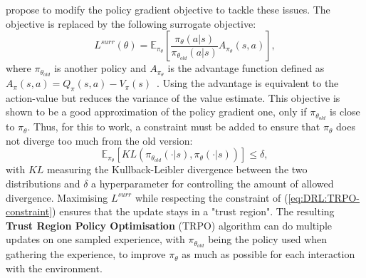 \citet{Schulman2015_TRPO} propose to modify the policy gradient objective to tackle these issues. The objective is replaced by the following surrogate objective:
\begin{equation}
    L^{surr}(\theta)=\mathbb{E}_{\pi_\theta}\left[\frac{\pi_\theta(a|s)}{\pi_{\theta_{old}}(a|s)}A_{\pi_\theta}(s,a)\right],
    \label{eq:DRL:TRPO-surr}
\end{equation}
where $\pi_{\theta_{old}}$ is another policy and $A_{\pi_\theta}$ is the advantage function defined as $A_\pi(s,a)=Q_\pi(s,a)-V_\pi(s)$~\citep{Baird1995_ResidAlgs}. Using the advantage is equivalent to the action-value but reduces the variance of the value estimate. This objective is shown to be a good approximation of the policy gradient one, only if $\pi_{\theta_{old}}$ is close to $\pi_\theta$. Thus, for this to work, a constraint must be added to ensure that $\pi_\theta$ does not diverge too much from the old version:
\begin{equation}
    \mathbb{E}_{\pi_\theta}\left[KL(\pi_{\theta_{old}}(\cdot|s),\pi_\theta(\cdot|s))\right]\leq\delta,
    \label{eq:DRL:TRPO-constraint}
\end{equation}
with $KL$ measuring the Kullback-Leibler divergence between the two distributions and $\delta$ a hyperparameter for controlling the amount of allowed divergence. Maximising $L^{surr}$ while respecting the constraint of (\ref{eq:DRL:TRPO-constraint}) ensures that the update stays in a "trust region". The resulting \textbf{Trust Region Policy Optimisation} (TRPO) algorithm can do multiple updates on one sampled experience, with $\pi_{\theta_{old}}$ being the policy used when gathering the experience, to improve $\pi_\theta$ as much as possible for each interaction with the environment.

